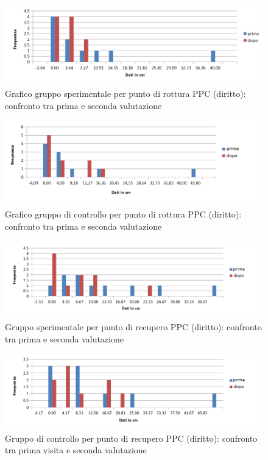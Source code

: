  \begin{figure}[h!]
	\centering
	\includegraphics[scale=0.8]{source/grafici/PPC_DIRITTO_DEFINITIVO_sperimentale.png}
	\caption[figure]{Grafico gruppo sperimentale per punto di rottura PPC (diritto): confronto tra prima e seconda valutazione}
	\label{fig:issuexample}
\end{figure}
 \begin{figure}[h!]
	\centering
	\includegraphics[scale=0.8]{source/grafici/PPC_DIRITTO_DEFINITIVO_GRUPPO_CONTROLLO.png}
	\caption[figure]{Grafico gruppo di controllo per punto di rottura PPC (diritto): confronto tra prima e seconda valutazione}
	\label{fig:issuexample}
\end{figure}
 \begin{figure}[h!]
	\centering
	\includegraphics[scale=0.8]{source/grafici/Recupero_PPC_diritto_Trattati.png}
	\caption[figure]{Gruppo sperimentale per punto di recupero PPC (diritto): confronto tra prima e seconda valutazione}
	\label{fig:issuexample}
\end{figure}
 \begin{figure}[h!]
	\centering
	\includegraphics[scale=0.8]{source/grafici/Recupero_PPC_diritto_Non_Trattati.png}
	\caption[figure]{Gruppo di controllo per punto di recupero PPC (diritto): confronto tra prima visita e seconda valutazione}
	\label{fig:issuexample}
\end{figure}


